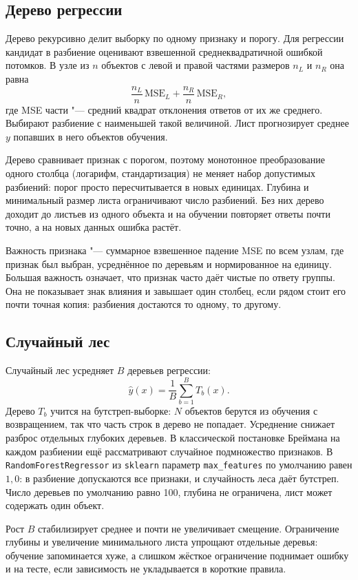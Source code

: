 \documentclass[14pt]{extarticle}
\begin{document}
\subsection{Дерево регрессии}
Дерево рекурсивно делит выборку по одному признаку и порогу. Для регрессии кандидат в разбиение оценивают взвешенной среднеквадратичной ошибкой потомков. В узле из $n$ объектов с левой и правой частями размеров $n_L$ и $n_R$ она равна
\[
\frac{n_L}{n}\,\mathrm{MSE}_L + \frac{n_R}{n}\,\mathrm{MSE}_R,
\]
где MSE части "--- средний квадрат отклонения ответов от их же среднего. Выбирают разбиение с наименьшей такой величиной. Лист прогнозирует среднее $y$ попавших в него объектов обучения.

Дерево сравнивает признак с порогом, поэтому монотонное преобразование одного столбца (логарифм, стандартизация) не меняет набор допустимых разбиений: порог просто пересчитывается в новых единицах. Глубина и минимальный размер листа ограничивают число разбиений. Без них дерево доходит до листьев из одного объекта и на обучении повторяет ответы почти точно, а на новых данных ошибка растёт.

Важность признака "--- суммарное взвешенное падение MSE по всем узлам, где признак был выбран, усреднённое по деревьям и нормированное на единицу. Большая важность означает, что признак часто даёт чистые по ответу группы. Она не показывает знак влияния и завышает один столбец, если рядом стоит его почти точная копия: разбиения достаются то одному, то другому.

\subsection{Случайный лес}
Случайный лес усредняет $B$ деревьев регрессии:
\[
\hat y(x) = \frac{1}{B}\sum_{b=1}^{B} T_b(x).
\]
Дерево $T_b$ учится на бутстреп-выборке: $N$ объектов берутся из обучения с возвращением, так что часть строк в дерево не попадает. Усреднение снижает разброс отдельных глубоких деревьев. В классической постановке Бреймана на каждом разбиении ещё рассматривают случайное подмножество признаков. В \texttt{RandomForestRegressor} из \texttt{sklearn} параметр \texttt{max\_features} по умолчанию равен $1{,}0$: в разбиение допускаются все признаки, и случайность леса даёт бутстреп. Число деревьев по умолчанию равно 100, глубина не ограничена, лист может содержать один объект.

Рост $B$ стабилизирует среднее и почти не увеличивает смещение. Ограничение глубины и увеличение минимального листа упрощают отдельные деревья: обучение запоминается хуже, а слишком жёсткое ограничение поднимает ошибку и на тесте, если зависимость не укладывается в короткие правила.
\end{document}
